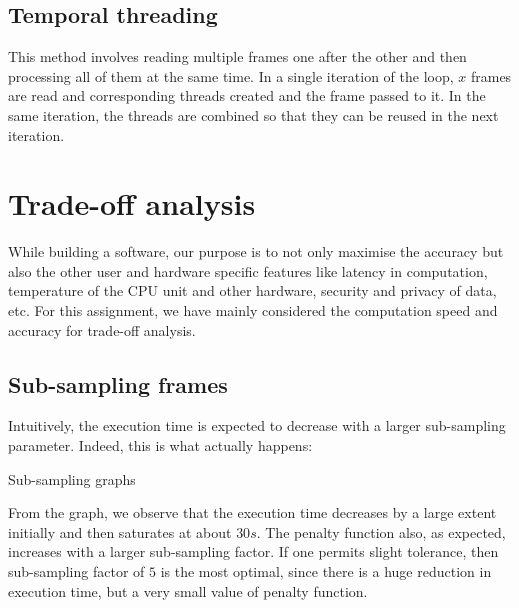 \documentclass{article}
\begin{document}
\subsection{Temporal threading}
This method involves reading multiple frames one after the other and then processing all of them at the same time. In a single iteration of the loop, $x$ frames are read and corresponding threads created and the frame passed to it. In the same iteration, the threads are combined so that they can be reused in the next iteration.

\section{Trade-off analysis}
While building a software, our purpose is to not only maximise the accuracy but also the other user and hardware specific features like latency in computation, temperature of the CPU unit and other hardware, security and privacy of data, etc. For this assignment, we have mainly considered the computation speed and accuracy for trade-off analysis.

\subsection{Sub-sampling frames}
Intuitively, the execution time is expected to decrease with a larger sub-sampling parameter. Indeed, this is what actually happens:
\begin{center}
    Sub-sampling graphs
\end{center}
From the graph, we observe that the execution time decreases by a large extent initially and then saturates at about $30s$. The penalty function also, as expected, increases with a larger sub-sampling factor. If one permits slight tolerance, then sub-sampling factor of $5$ is the most optimal, since there is a huge reduction in execution time, but a very small value of penalty function.
\end{document}
